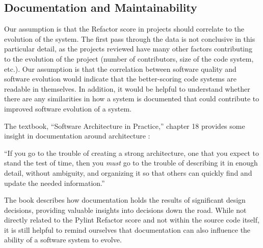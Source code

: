 \subsection{Documentation and Maintainability} \label{subDocumentation}


Our assumption is that the Refactor score in projects should correlate to the evolution of the system. The first pass through the data is not conclusive in this particular detail, as the projects reviewed have many other factors contributing to the evolution of the project (number of contributors, size of the code system, etc.). Our assumption is that the correlation between software quality and software evolution would indicate that the better-scoring code systems are readable in themselves. In addition, it would be helpful to understand whether there are any similarities in how a system is documented that could contribute to improved software evolution of a system.




The textbook, ``Software Architecture in Practice,'' chapter 18 provides some insight in documentation around architecture \cite{book:software-architecture-in-practice}:

\vspace{0.25cm}
\begin{displayquote}
  ``If you go to the trouble of creating a strong architecture, one that you expect to stand the test of time, then you \textit{must} go to the trouble of describing it in enough detail, without ambiguity, and organizing it so that others can quickly find and update the needed information.''
\end{displayquote}
\vspace{0.25cm}

The book describes how documentation holds the results of significant design decisions, providing valuable insights into decisions down the road. While not directly related to the Pylint Refactor score and not within the source code itself, it is still helpful to remind ourselves that documentation can also influence the ability of a software system to evolve.

